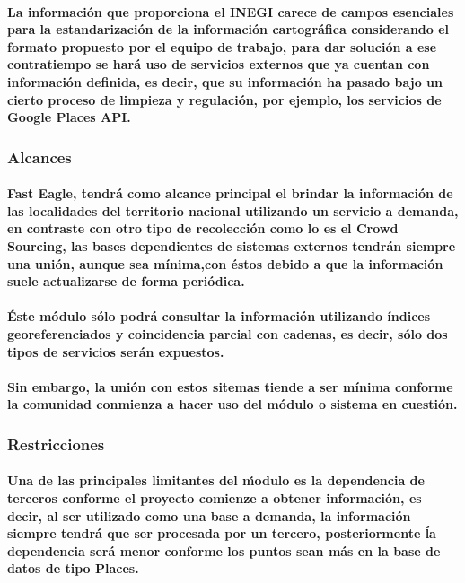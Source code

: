     \paragraph{La información que proporciona el INEGI carece de campos esenciales para la estandarización de la información cartográfica considerando el formato propuesto por el equipo de trabajo, para dar solución a ese contratiempo se hará uso de servicios externos que ya cuentan con información definida, es decir, que su información ha pasado bajo un cierto proceso de limpieza y regulación, por ejemplo, los servicios de Google Places API.}
  \subsubsection{Alcances}
    \paragraph{Fast Eagle, tendrá como alcance principal el brindar la información de las localidades del territorio nacional utilizando un servicio a demanda, en contraste con otro tipo de recolección como lo es el Crowd Sourcing\cite{37}, las bases dependientes de sistemas externos tendrán siempre una unión, aunque sea mínima,con éstos debido a que la información suele actualizarse de forma periódica.}
    \paragraph{Éste módulo sólo podrá consultar la información utilizando índices georeferenciados y coincidencia parcial con cadenas, es decir, sólo dos tipos de servicios serán expuestos.} 
    \paragraph{Sin embargo, la unión con estos sitemas tiende a ser mínima conforme la comunidad conmienza a hacer uso del módulo o sistema en cuestión.}
  \subsubsection{Restricciones}
    \paragraph{Una de las principales limitantes del ḿodulo es la dependencia de terceros conforme el proyecto comienze a obtener información, es decir, al ser utilizado como una base a demanda, la información siempre tendrá que ser procesada por un tercero, posteriormente ĺa dependencia será menor conforme los puntos sean más en la base de datos de tipo Places.}
